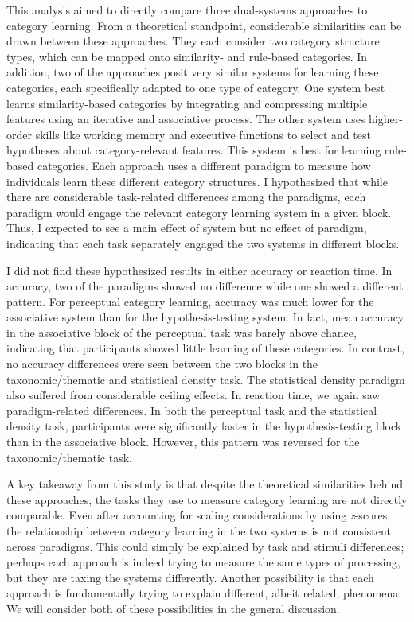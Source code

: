 \documentclass[../dissertation.tex]{subfiles}
\begin{document}
This analysis aimed to directly compare three dual-systems approaches to category learning. From a theoretical standpoint, considerable similarities can be drawn between these approaches. They each consider two category structure types, which can be mapped onto similarity- and rule-based categories. In addition, two of the approaches posit very similar systems for learning these categories, each specifically adapted to one type of category. One system best learns similarity-based categories by integrating and compressing multiple features using an iterative and associative process. The other system uses higher-order skills like working memory and executive functions to select and test hypotheses about category-relevant features. This system is best for learning rule-based categories. Each approach uses a different paradigm to measure how individuals learn these different category structures. I hypothesized that while there are considerable task-related differences among the paradigms, each paradigm would engage the relevant category learning system in a given block. Thus, I expected to see a main effect of system but no effect of paradigm, indicating that each task separately engaged the two systems in different blocks. \par
	I did not find these hypothesized results in either accuracy or reaction time. In accuracy, two of the paradigms showed no difference while one showed a different pattern. For perceptual category learning, accuracy was much lower for the associative system than for the hypothesis-testing system. In fact, mean accuracy in the associative block of the perceptual task was barely above chance, indicating that participants showed little learning of these categories. In contrast, no accuracy differences were seen between the two blocks in the taxonomic/thematic and statistical density task. The statistical density paradigm also suffered from considerable ceiling effects. In reaction time, we again saw paradigm-related differences. In both the perceptual task and the statistical density task, participants were significantly faster in the hypothesis-testing block than in the associative block. However, this pattern was reversed for the taxonomic/thematic task. \par
	A key takeaway from this study is that despite the theoretical similarities behind these approaches, the tasks they use to measure category learning are not directly comparable. Even after accounting for scaling considerations by using \textit{z}-scores, the relationship between category learning in the two systems is not consistent across paradigms. This could simply be explained by task and stimuli differences; perhaps each approach is indeed trying to measure the same types of processing, but they are taxing the systems differently. Another possibility is that each approach is fundamentally trying to explain different, albeit related, phenomena. We will consider both of these possibilities in the general discussion. 
\end{document}
